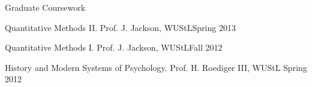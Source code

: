 \documentclass {resume}
\newlength{\wideitemsep}
\let\olditem\item
\renewcommand{\item}{\setlength{\itemsep}{\wideitemsep}\olditem}
\begin{document}
\begin{rSection}{\textrm{Graduate Coursework}}
\begin{etaremune}
\item Quantitative Methods \textrm{II}. Prof. J. Jackson, WUStL\hfill  {Spring 2013}
\item Quantitative Methods \textrm{I}. Prof. J. Jackson, WUStL\hfill  {Fall 2012}
\item History and Modern Systems of Psychology. Prof. H. Roediger \textrm{III}, WUStL \hfill  {Spring 2012}\end{etaremune}
\begin{comment}
{\large \textbf{Supplemental Training}}\\
Data Mining. Prof. R. Stine, U. of Michigan\hfill  {Summer 2014}\smallskip\\
Intro. to Human Behavioral Genetics. Coursera, U. of Minnesota\hfill{Summer 2014}%
\smallskip\\
Big Data and Social Physics. edX, MIT\hfill{Summer 2014}%
\smallskip\\
Statistical Analysis of fMRI Data. Coursera, Johns Hopkins\hfill{Winter 2014}%
\smallskip\\
Social Epidemiology. Coursera, U. of Minnesota\hfill{Summer 2013}%
\vspace{-2mm}\begin{center}\footnotesize{ \textit{upcoming} or \textit{in progress}
}\end{center} \vspace{-4mm}
\end{comment}
\end{rSection}

\end{document}
